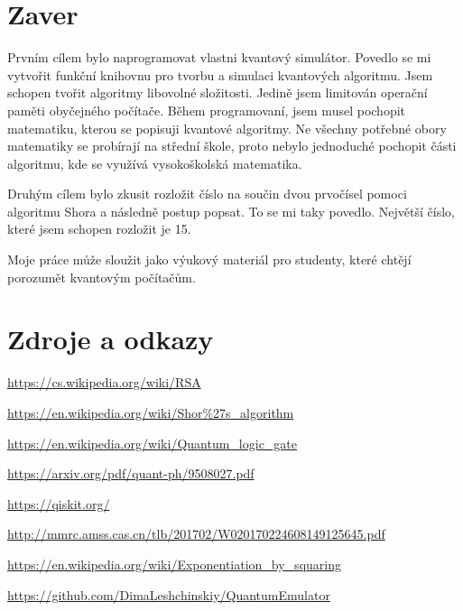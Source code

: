 \documentclass[11pt]{article}
\begin{document}
\newpage

\section{Zaver}
Prvním cílem bylo naprogramovat vlastni kvantový simulátor. Povedlo se mi vytvořit funkční knihovnu pro tvorbu a simulaci kvantových algoritmu.
Jsem schopen tvořit algoritmy libovolné složitosti.
Jedině jsem limitován operační paměti obyčejného počítače.
Během programovaní, jsem musel pochopit matematiku, kterou se popisuji kvantové algoritmy.
Ne všechny potřebné obory matematiky se probírají na střední škole,
proto nebylo jednoduché pochopit části algoritmu, kde se využívá vysokoškolská matematika.
\par Druhým cílem bylo zkusit rozložit číslo na součin dvou prvočísel pomoci algoritmu Shora a následně postup popsat.
To se mi taky povedlo.
Největší číslo, které jsem schopen rozložit je 15.
\par Moje práce může sloužit jako výukový materiál pro studenty, které chtějí porozumět kvantovým počítačům.
\newpage

\section{Zdroje a odkazy}
\color{blue}
\fontsize{10pt}{0}
\url{https://cs.wikipedia.org/wiki/RSA}
\par\url{https://en.wikipedia.org/wiki/Shor%27s_algorithm}
\par\url{https://en.wikipedia.org/wiki/Quantum_logic_gate}
\par\url{https://arxiv.org/pdf/quant-ph/9508027.pdf}
\par\url{https://qiskit.org/}
\par\url{http://mmrc.amss.cas.cn/tlb/201702/W020170224608149125645.pdf}
\par\url{https://en.wikipedia.org/wiki/Exponentiation_by_squaring}
\par\url{https://github.com/DimaLeshchinskiy/QuantumEmulator}
\end{document}
